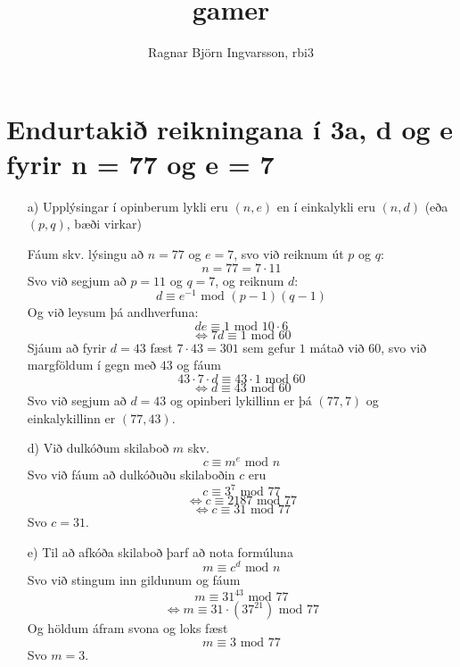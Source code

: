 \documentclass{article}
\title{gamer}
\author{Ragnar Björn Ingvarsson, rbi3}
\begin{document}
\renewcommand\thepage{}

	\maketitle

	\newpage
	\setcounter{page}{1}
	\renewcommand\thepage{\arabic{page}}

	\section{}
	\section{}
	\section{}
	\section{Endurtakið reikningana í 3a, d og e fyrir n = 77 og e = 7}
	\begin{itemize}
		\item[a)] Upplýsingar í opinberum lykli eru $(n,e)$ en í 
			einkalykli eru $(n,d)$ (eða $(p,q)$, bæði virkar)

			Fáum skv. lýsingu að $n=77$ og $e=7$, svo við reiknum út $p$ og 
			$q$:
			\[
				n = 77 = 7\cdot 11
			\]
			Svo við segjum að $p=11$ og $q=7$, og reiknum $d$:
			\begin{equation}
				d \equiv e^{-1}\text{ mod } (p-1)(q-1)
				\label{eq:gamer1}
			\end{equation}
			Og við leysum þá andhverfuna:
			\[de \equiv 1\text{ mod } 10\cdot6\]
			\[\iff 7d\equiv 1\text{ mod }60\]
			Sjáum að fyrir $d=43$ fæst $7\cdot43 = 301$ sem gefur $1$ 
			mátað við $60$, svo við margföldum í gegn með $43$ og fáum
			\[43\cdot 7\cdot d \equiv 43\cdot1\text{ mod } 60\]
			\[\iff d \equiv 43\text{ mod }60\]
			Svo við segjum að $d = 43$ og opinberi lykillinn er þá 
			$(77,7)$ og einkalykillinn er $(77,43)$.
		\item[d)] Við dulkóðum skilaboð $m$ skv.
			\begin{equation}
				c \equiv m^e\text{ mod }n
				\label{eq:gamer2}
			\end{equation}
			Svo við fáum að dulkóðuðu skilaboðin $c$ eru
			\[c \equiv 3^7\text{ mod }77\]
			\[\iff c\equiv 2187\text{ mod }77\]
			\[\iff c\equiv 31\text{ mod }77\]
			Svo $c = 31$.
		\item[e)] Til að afkóða skilaboð þarf að nota formúluna
			\begin{equation}
				m \equiv c^d\text{ mod }n
				\label{eq:gamer3}
			\end{equation}
			Svo við stingum inn gildunum og fáum
			\[m\equiv 31^{43}\text{ mod }77\]
			\[\iff m\equiv 31\cdot(37^{21})\text{ mod }77\]
			Og höldum áfram svona og loks fæst
			\[m\equiv 3\text{ mod }77\]
			Svo $m=3$.
	\end{itemize}
\end{document}
